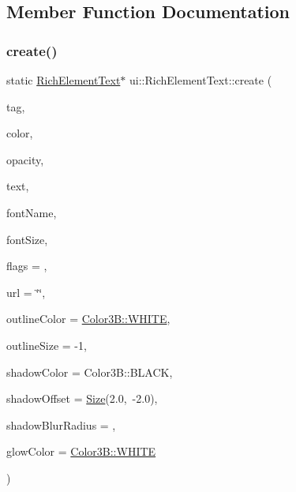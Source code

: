 \subsection{Member Function Documentation}
\mbox{\label{classui_1_1RichElementText_a47319954085ea39d049f820662129ce0}} 
\subsubsection{\texorpdfstring{create()}{create()}\hspace{0.1cm}{\footnotesize\ttfamily [1/2]}}
{\footnotesize\ttfamily static \hyperlink{classui_1_1RichElementText}{Rich\+Element\+Text}$\ast$ ui\+::\+Rich\+Element\+Text\+::create (\begin{DoxyParamCaption}\item[{int}]{tag,  }\item[{const \hyperlink{structColor3B}{Color3B} \&}]{color,  }\item[{G\+Lubyte}]{opacity,  }\item[{const std\+::string \&}]{text,  }\item[{const std\+::string \&}]{font\+Name,  }\item[{float}]{font\+Size,  }\item[{uint32\+\_\+t}]{flags = {},  }\item[{const std\+::string \&}]{url = {\ttfamily \char`\"{}\char`\"{}},  }\item[{const \hyperlink{structColor3B}{Color3B} \&}]{outline\+Color = {\ttfamily \hyperlink{structColor3B_adf57cb86ca15f434b29215ad471cdc35}{Color3\+B\+::\+W\+H\+I\+TE}},  }\item[{int}]{outline\+Size = {\ttfamily -\/1},  }\item[{const \hyperlink{structColor3B}{Color3B} \&}]{shadow\+Color = {\ttfamily Color3B\+:\+:BLACK},  }\item[{const cocos2d\+::\+Size \&}]{shadow\+Offset = {\ttfamily \hyperlink{classSize}{Size}(2.0,~-\/2.0)},  }\item[{int}]{shadow\+Blur\+Radius = {},  }\item[{const \hyperlink{structColor3B}{Color3B} \&}]{glow\+Color = {\ttfamily \hyperlink{structColor3B_adf57cb86ca15f434b29215ad471cdc35}{Color3\+B\+::\+W\+H\+I\+TE}} }\end{DoxyParamCaption})\hspace{0.3cm}{\ttfamily [static]}}



